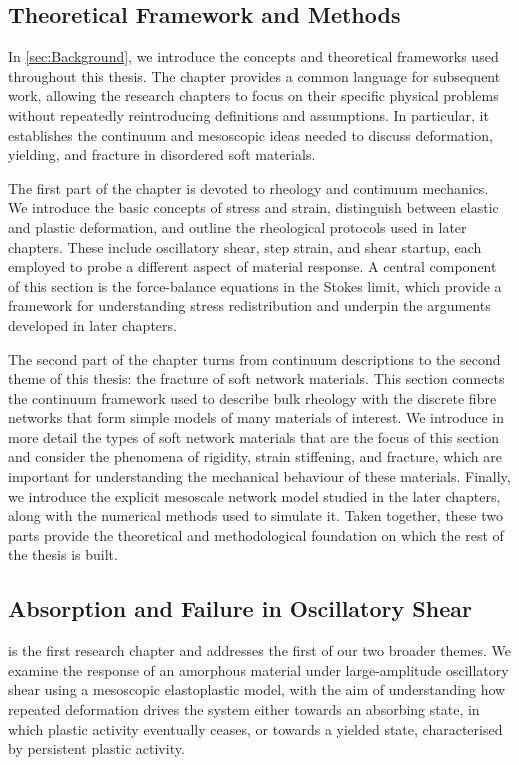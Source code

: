 \subsection*{Theoretical Framework and Methods}
In \cref{sec:Background}, we introduce the concepts and theoretical frameworks used throughout this thesis. The chapter provides a common language for subsequent work, allowing the research chapters to focus on their specific physical problems without repeatedly reintroducing definitions and assumptions. In particular, it establishes the continuum and mesoscopic ideas needed to discuss deformation, yielding, and fracture in disordered soft materials.

The first part of the chapter is devoted to rheology and continuum mechanics. We introduce the basic concepts of stress and strain, distinguish between elastic and plastic deformation, and outline the rheological protocols used in later chapters. These include oscillatory shear, step strain, and shear startup, each employed to probe a different aspect of material response. A central component of this section is the force-balance equations in the Stokes limit, which provide a framework for understanding stress redistribution and underpin the arguments developed in later chapters.

The second part of the chapter turns from continuum descriptions to the second theme of this thesis: the fracture of soft network materials. This section connects the continuum framework used to describe bulk rheology with the discrete fibre networks that form simple models of many materials of interest. We introduce in more detail the types of soft network materials that are the focus of this section and consider the phenomena of rigidity, strain stiffening, and fracture, which are important for understanding the mechanical behaviour of these materials. Finally, we introduce the explicit mesoscale network model studied in the later chapters, along with the numerical methods used to simulate it. Taken together, these two parts provide the theoretical and methodological foundation on which the rest of the thesis is built.

\subsection*{Absorption and Failure in Oscillatory Shear}
 is the first research chapter and addresses the first of our two broader themes. We examine the response of an amorphous material under large-amplitude oscillatory shear using a mesoscopic elastoplastic model, with the aim of understanding how repeated deformation drives the system either towards an absorbing state, in which plastic activity eventually ceases, or towards a yielded state, characterised by persistent plastic activity.

